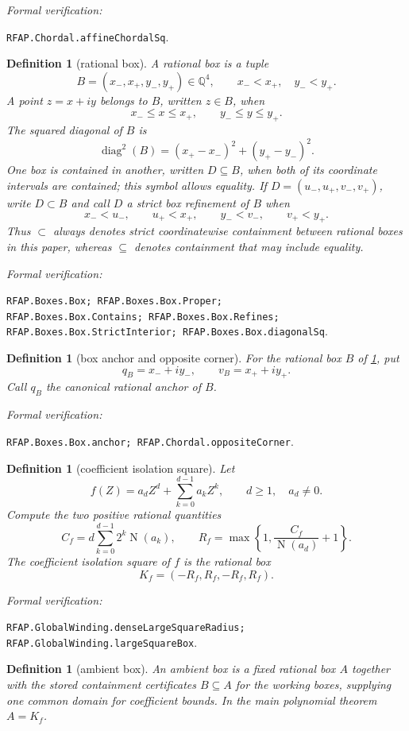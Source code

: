 \documentclass[11pt]{article}
\newtheorem{definition}[theorem]{Definition}
\newcommand{\Q}{\mathbb{Q}}
\newcommand{\Norm}[1]{\operatorname{N}\!\left(#1\right)}
\newcommand{\diamq}{\operatorname{diag}^{2}}
\newcommand{\leanref}[1]{\par\smallskip\noindent
  \emph{Formal verification:}\par\nobreak
  {\raggedright\nolinkurl{#1}.\par}}
\begin{document}
\leanref{RFAP.Chordal.affineChordalSq}

\begin{definition}[rational box]
\label{def:rational-box}
A \emph{rational box} is a tuple
\[
 B=(x_-,x_+,y_-,y_+)\in\Q^4,
 \qquad x_-<x_+,\quad y_-<y_+.
\]
A point $z=x+iy$ belongs to $B$, written $z\in B$, when
\[
        x_-\le x\le x_+,\qquad y_-\le y\le y_+.
\]
The \emph{squared diagonal} of $B$ is
\[
       \diamq(B)=(x_+-x_-)^2+(y_+-y_-)^2.
\]
One box is contained in another, written $D\subseteq B$, when both of its
coordinate intervals are contained; this symbol allows equality.  If
$D=(u_-,u_+,v_-,v_+)$, write $D\subset B$ and call $D$ a \emph{strict box
refinement} of $B$ when
\[
 x_-<u_-,\qquad u_+<x_+,\qquad
 y_-<v_-,\qquad v_+<y_+.
\]
Thus $\subset$ always denotes strict coordinatewise containment between
rational boxes in this paper, whereas $\subseteq$ denotes containment that
may include equality.
\end{definition}

\leanref{RFAP.Boxes.Box; RFAP.Boxes.Box.Proper;
RFAP.Boxes.Box.Contains; RFAP.Boxes.Box.Refines;
RFAP.Boxes.Box.StrictInterior; RFAP.Boxes.Box.diagonalSq}

\begin{definition}[box anchor and opposite corner]
\label{def:box-corners}
For the rational box $B$ of \cref{def:rational-box}, put
\[
 q_B=x_-+iy_-,
 \qquad
 v_B=x_++iy_+.
\]
Call $q_B$ the canonical rational \emph{anchor} of $B$.
\end{definition}

\leanref{RFAP.Boxes.Box.anchor; RFAP.Chordal.oppositeCorner}

\begin{definition}[coefficient isolation square]
\label{def:coefficient-isolation-square}
Let
\[
       f(Z)=a_dZ^d+\sum_{k=0}^{d-1}a_kZ^k,
       \qquad d\ge1,\quad a_d\ne0.
\]
Compute the two positive rational quantities
\begin{equation}
\label{eq:isolation-radius}
 C_f=d\sum_{k=0}^{d-1}2^k\Norm{a_k},
 \qquad
 R_f=\max\left\{1,\frac{C_f}{\Norm{a_d}}+1\right\}.
\end{equation}
The \emph{coefficient isolation square} of $f$ is the rational box
\[
                     K_f=(-R_f,R_f,-R_f,R_f).
\]
\end{definition}

\leanref{RFAP.GlobalWinding.denseLargeSquareRadius;
RFAP.GlobalWinding.largeSquareBox}

\begin{definition}[ambient box]
\label{def:ambient-box}
An \emph{ambient box} is a fixed rational box $A$
together with the stored containment certificates $B\subseteq A$ for the
working boxes, supplying one common domain for coefficient bounds.  In the
main polynomial theorem $A=K_f$.
\end{definition}
\end{document}
